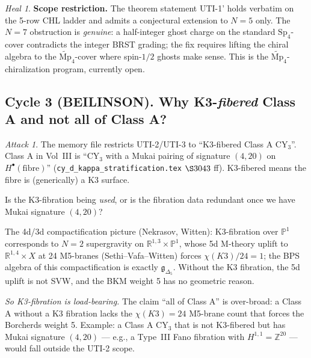 \documentclass[11pt]{amsart}
\theoremstyle{definition}
\theoremstyle{remark}
\newtheorem{attack}[theorem]{Attack}
\newtheorem{heal}[theorem]{Heal}
\begin{document}
\begin{heal}
\textbf{Scope restriction.} The theorem statement UTI-1' holds verbatim on the 5-row CHL ladder and
admits a conjectural extension to $N = 5$ only. The $N = 7$ obstruction is \emph{genuine}: a
half-integer ghost charge on the standard $\mathrm{Sp}_4$-cover contradicts the integer BRST
grading; the fix requires lifting the chiral algebra to the $\widetilde{\mathrm{Mp}}_4$-cover
where spin-$1/2$ ghosts make sense. This is the $\widetilde{\mathrm{Mp}}_4$-chiralization program,
currently open.
\end{heal}

\subsection{Cycle 3 (BEILINSON). Why K3-\emph{fibered} Class A and not all of Class A?}

\begin{attack}
The memory file restricts UTI-2/UTI-3 to ``K3-fibered Class A CY$_3$''. Class A in Vol~III
is ``CY$_3$ with a Mukai pairing of signature $(4, 20)$ on $H^\bullet(\mathrm{fibre})$''
(\texttt{cy\_d\_kappa\_stratification.tex} $\S3043$ ff). K3-fibered means the fibre is
(generically) a K3 surface.

Is the K3-fibration being \emph{used}, or is the fibration data redundant once we have Mukai
signature $(4, 20)$?

The 4d/3d compactification picture (Nekrasov, Witten): K3-fibration over $\mathbb{P}^1$ corresponds
to $N=2$ supergravity on $\mathbb{R}^{1,3} \times \mathbb{P}^1$, whose 5d M-theory uplift to
$\mathbb{R}^{1,4} \times X$ at 24 M5-branes (Sethi--Vafa--Witten) forces $\chi(K3)/24 = 1$; the
BPS algebra of this compactification is exactly $\mathfrak{g}_{\Delta_5}$. Without the K3 fibration,
the 5d uplift is not SVW, and the BKM weight 5 has no geometric reason.

\emph{So K3-fibration is load-bearing.} The claim ``all of Class A'' is over-broad: a Class A
without a K3 fibration lacks the $\chi(K3) = 24$ M5-brane count that forces the Borcherds
weight 5. Example: a Class A CY$_3$ that is not K3-fibered but has Mukai signature $(4,20)$
--- e.g., a Type~III Fano fibration with $H^{1,1} = \mathbb{Z}^{20}$ --- would fall outside
the UTI-2 scope.
\end{attack}
\end{document}
